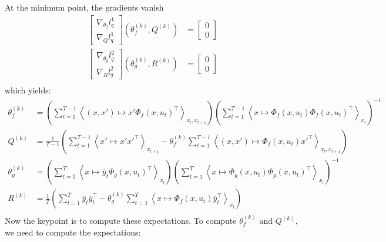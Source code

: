 At the minimum point, the gradients vanish
\begin{align*}
  \left[
    \begin{array}{c} \nabla_{\theta_f} l^1_q \\ \nabla_{Q} l^1_q \end{array}
  \right] \left(\theta_f^{(k)}, Q^{(k)}\right) &=
  \left[
    \begin{array}{c} 0 \\ 0 \end{array}
  \right]\\
  \left[
    \begin{array}{c} \nabla_{\theta_g} l^2_q \\ \nabla_{R} l^2_q \end{array}
  \right] \left(\theta_g^{(k)}, R^{(k)} \right) &=
  \left[
    \begin{array}{c} 0 \\ 0 \end{array}
  \right] \\
\end{align*}
which yields:
\begin{align*}
  \theta_f^{(k)} &=
    \left(
      \sum_{t=1}^{T-1}{\left< (x,x') \mapsto x' \Phi_f(x,u_t)^{\top} \right>_{x_t,x_{t+1}}}
    \right)
    \left(
      \sum_{t=1}^{T-1}{\left< x \mapsto \Phi_f(x, u_t)\Phi_f(x,u_t)^{\top} \right>_{x_t}}
    \right)^{-1}
  \\
  Q^{(k)} &=
    \frac{1}{T-1}
    \left(
      \sum_{t=1}^{T-1}{\left< x' \mapsto x'x'^{\top} \right>_{x_{t+1}}} -
      \theta_f^{(k)} \sum_{t=1}^{T-1}{\left< (x,x') \mapsto \Phi_f(x, u_t) x'^{\top} \right>_{x_t,x_{t+1}}}
    \right)
  \\
  \theta_g^{(k)} &=
    \left(
      \sum_{t=1}^{T}{\left< x \mapsto \overline{y}_{t}\Phi_g(x,u_t)^{\top} \right>_{x_t}}
    \right)
    \left(
      \sum_{t=1}^{T}{\left< x \mapsto \Phi_g(x,u_t)\Phi_g(x,u_t)^{\top} \right>_{x_t}}
    \right)^{-1}
  \\
  R^{(k)} &=
    \frac{1}{T}
    \left(
      \sum_{t=1}^{T}{\overline{y}_t \overline{y}_t^{\top}} -
      \theta_g^{(k)} \sum_{t=1}^{T}{\left< x \mapsto \Phi_f(x, u_t) \overline{y}_t^{\top} \right>_{x_t}}
    \right)
  \\
\end{align*}
Now the keypoint is to compute these expectations.
To compute $\theta_f^{(k)}$ and $Q^{(k)}$, we need to compute the expectations:
